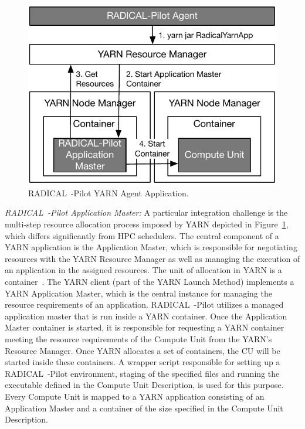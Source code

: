 \begin{figure}[t]
    \centering
    \includegraphics[width=.65\textwidth]{figures/data_analytics_hpc/hpc_hadoop/yarn.pdf}
    \caption{RADICAL~-Pilot YARN Agent Application.}
    \label{fig:figures_yarn}
\end{figure}

\emph{RADICAL~-Pilot Application Master:}
A particular integration challenge is the multi-step resource allocation process imposed by YARN depicted in Figure~\ref{fig:figures_yarn}, which differs significantly from HPC schedulers.
The central component of a YARN application is the Application Master, which is responsible for negotiating resources with the YARN Resource Manager as well as managing the execution of an application in the assigned resources.
The unit of allocation in YARN is a container~\cite{murthy2014apache}.
The YARN client (part of the YARN Launch Method) implements a YARN Application Master, which is the central instance for managing the resource requirements of an application.
RADICAL~-Pilot utilizes a managed application master that is run inside a YARN container.
Once the Application Master container is started, it is responsible for requesting a YARN container meeting the resource requirements of the Compute Unit from the YARN's Resource Manager.
Once YARN allocates a set of containers, the CU will be started inside these containers.
A wrapper script responsible for setting up a RADICAL~-Pilot environment, staging of the specified files and running the executable defined in the Compute Unit Description, is used for this purpose.
Every Compute Unit is mapped to a YARN application consisting of an Application Master and a container of the size specified in the Compute Unit Description.

